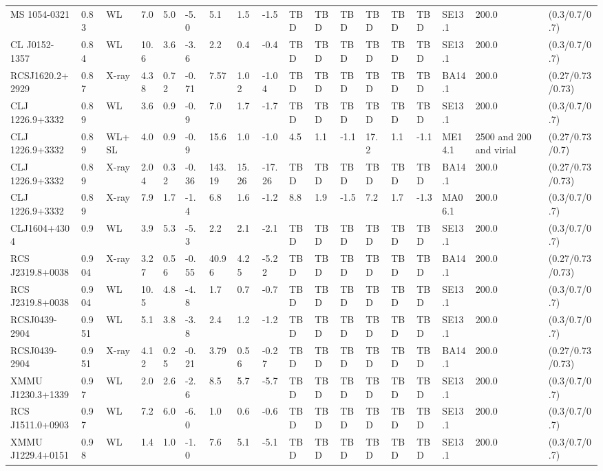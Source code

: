\documentclass{article}
\begin{document}
\begin{center}
\begin{landscape}
\begin{longtable}{llllllllllllllllll}
MS 1054-0321 & 0.83 & WL & 7.0 & 5.0 & -5.0 & 5.1 & 1.5 & -1.5 & TBD & TBD & TBD & TBD & TBD & TBD & SE13.1 & 200.0 & (0.3/0.7/0.7) \\
CL J0152-1357 & 0.84 & WL & 10.6 & 3.6 & -3.6 & 2.2 & 0.4 & -0.4 & TBD & TBD & TBD & TBD & TBD & TBD & SE13.1 & 200.0 & (0.3/0.7/0.7) \\
RCSJ1620.2+2929 & 0.87 & X-ray & 4.38 & 0.72 & -0.71 & 7.57 & 1.02 & -1.04 & TBD & TBD & TBD & TBD & TBD & TBD & BA14.1 & 200.0 & (0.27/0.73/0.73) \\
CLJ 1226.9+3332 & 0.89 & WL & 3.6 & 0.9 & -0.9 & 7.0 & 1.7 & -1.7 & TBD & TBD & TBD & TBD & TBD & TBD & SE13.1 & 200.0 & (0.3/0.7/0.7) \\
CLJ 1226.9+3332 & 0.89 & WL+SL & 4.0 & 0.9 & -0.9 & 15.6 & 1.0 & -1.0 & 4.5 & 1.1 & -1.1 & 17.2 & 1.1 & -1.1 & ME14.1 & 2500 and 200 and virial & (0.27/0.73/0.7) \\
CLJ 1226.9+3332 & 0.89 & X-ray & 2.04 & 0.32 & -0.36 & 143.19 & 15.26 & -17.26 & TBD & TBD & TBD & TBD & TBD & TBD & BA14.1 & 200.0 & (0.27/0.73/0.73) \\
CLJ 1226.9+3332 & 0.89 & X-ray & 7.9 & 1.7 & -1.4 & 6.8 & 1.6 & -1.2 & 8.8 & 1.9 & -1.5 & 7.2 & 1.7 & -1.3 & MA06.1 & 200.0 & (0.3/0.7/0.7) \\
CLJ1604+4304 & 0.9 & WL & 3.9 & 5.3 & -5.3 & 2.2 & 2.1 & -2.1 & TBD & TBD & TBD & TBD & TBD & TBD & SE13.1 & 200.0 & (0.3/0.7/0.7) \\
RCS J2319.8+0038 & 0.904 & X-ray & 3.27 & 0.56 & -0.55 & 40.96 & 4.25 & -5.22 & TBD & TBD & TBD & TBD & TBD & TBD & BA14.1 & 200.0 & (0.27/0.73/0.73) \\
RCS J2319.8+0038 & 0.904 & WL & 10.5 & 4.8 & -4.8 & 1.7 & 0.7 & -0.7 & TBD & TBD & TBD & TBD & TBD & TBD & SE13.1 & 200.0 & (0.3/0.7/0.7) \\
RCSJ0439-2904 & 0.951 & WL & 5.1 & 3.8 & -3.8 & 2.4 & 1.2 & -1.2 & TBD & TBD & TBD & TBD & TBD & TBD & SE13.1 & 200.0 & (0.3/0.7/0.7) \\
RCSJ0439-2904 & 0.951 & X-ray & 4.12 & 0.25 & -0.21 & 3.79 & 0.56 & -0.27 & TBD & TBD & TBD & TBD & TBD & TBD & BA14.1 & 200.0 & (0.27/0.73/0.73) \\
XMMU J1230.3+1339 & 0.97 & WL & 2.0 & 2.6 & -2.6 & 8.5 & 5.7 & -5.7 & TBD & TBD & TBD & TBD & TBD & TBD & SE13.1 & 200.0 & (0.3/0.7/0.7) \\
RCS J1511.0+0903 & 0.97 & WL & 7.2 & 6.0 & -6.0 & 1.0 & 0.6 & -0.6 & TBD & TBD & TBD & TBD & TBD & TBD & SE13.1 & 200.0 & (0.3/0.7/0.7) \\
XMMU J1229.4+0151 & 0.98 & WL & 1.4 & 1.0 & -1.0 & 7.6 & 5.1 & -5.1 & TBD & TBD & TBD & TBD & TBD & TBD & SE13.1 & 200.0 & (0.3/0.7/0.7) \\

\end{longtable}
\end{landscape}
\end{center}
\end{document}
